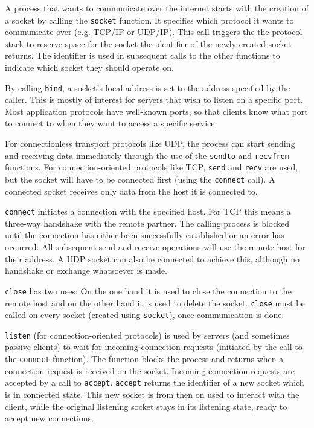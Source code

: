 \documentclass[11pt,twoside,abstract,notitlepage]{scrreprt}
\begin{document}
A process that wants to communicate over the internet starts with the creation of a socket by calling the \texttt{socket} function. It specifies which protocol it wants to communicate over (e.g. TCP/IP or UDP/IP). This call triggers the the protocol stack to reserve space for the socket the identifier of the newly-created socket returns. The identifier is used in subsequent calls to the other functions to indicate which socket they should operate on.

By calling \texttt{bind}, a socket's local address is set to the address specified by the caller. This is mostly of interest for servers that wish to listen on a specific port. Most application protocols have well-known ports, so that clients know what port to connect to when they want to access a specific service.

For connectionless transport protocols like UDP, the process can start sending and receiving data immediately through the use of the \texttt{sendto} and \texttt{recvfrom} functions. For connection-oriented protocols like TCP, \texttt{send} and \texttt{recv} are used, but the socket will have to be connected first (using the \texttt{connect} call). A connected socket receives only data from the host it is connected to.

\texttt{connect} initiates a connection with the specified host. For TCP this means a three-way handshake with the remote partner. The calling process is blocked until the connection has either been successfully established or an error has occurred. All subsequent send and receive operations will use the remote host for their address. A UDP socket can also be connected to achieve this, although no handshake or exchange whatsoever is made.

\texttt{close} has two uses: On the one hand it is used to close the connection to the remote host and on the other hand it is used to delete the socket. \texttt{close} must be called on every socket (created using \texttt{socket}), once communication is done.

\texttt{listen} (for connection-oriented protocols) is used by servers (and sometimes passive clients) to wait for incoming connection requests (initiated by the call to the \texttt{connect} function). The function blocks the process and returns when a connection request is received on the socket. Incoming connection requests are accepted by a call to \texttt{accept}. \texttt{accept} returns the identifier of a new socket which is in connected state. This new socket is from then on used to interact with the client, while the original listening socket stays in its listening state, ready to accept new connections. 
\end{document}
